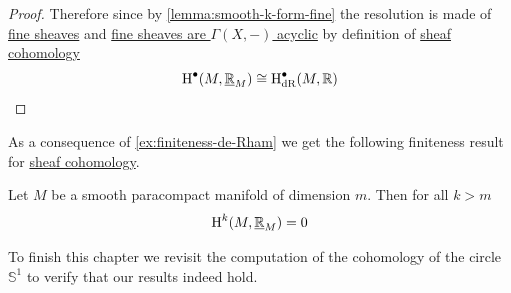 \documentclass[../../main]{subfiles}
\begin{document}
\begin{proof}
  Therefore since by \autoref{lemma:smooth-k-form-fine} the resolution is made of \hyperref[def:fine-sheaf]{fine sheaves} and \hyperref[prop:fine-are-acyclic]{fine sheaves are \(\Gamma(X, -)\) acyclic} by definition of \hyperref[def:sheaf-cohomology]{sheaf cohomology}
  \begin{equation*}
      \operatorname{H}^{\bullet}(M, \underline{\mathbb{R}}_{M}) \cong \operatorname{H}^{\bullet}_{\operatorname{dR}}(M, \mathbb{R}) \qedhere
  \end{equation*}
\end{proof}

As a consequence of \autoref{ex:finiteness-de-Rham} we get the following finiteness result for \hyperref[def:sheaf-cohomology]{sheaf cohomology}.
\begin{corollary}
  Let \(M\) be a smooth paracompact manifold of dimension \(m\).
  Then for all \(k > m\)
  \begin{equation*}
    \operatorname{H}^{k}(M, \underline{\mathbb{R}}_{M}) = 0
  \end{equation*}
\end{corollary}

To finish this chapter we revisit the computation of the cohomology of the circle \(\mathbb{S}^{1}\) to verify that our results indeed hold.
\end{document}
